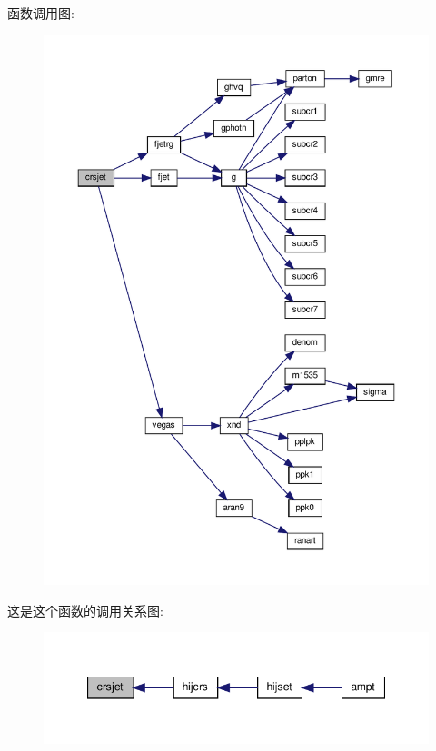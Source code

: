函数调用图\+:
\nopagebreak
\begin{figure}[H]
\begin{center}
\leavevmode
\includegraphics[width=350pt]{crsjet_8f90_af2fc33e94c1b4d97324c05704f5e1130_cgraph}
\end{center}
\end{figure}
这是这个函数的调用关系图\+:
\nopagebreak
\begin{figure}[H]
\begin{center}
\leavevmode
\includegraphics[width=347pt]{crsjet_8f90_af2fc33e94c1b4d97324c05704f5e1130_icgraph}
\end{center}
\end{figure}
